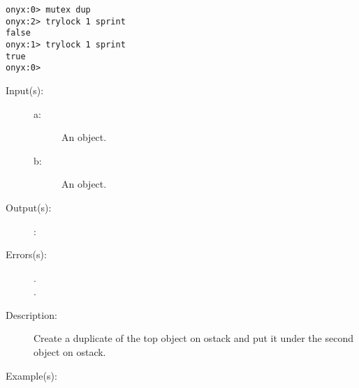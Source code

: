 \begin{description}
\begin{description}
\begin{verbatim}
onyx:0> mutex dup
onyx:2> trylock 1 sprint
false
onyx:1> trylock 1 sprint
true
onyx:0>
		\end{verbatim}
	\end{description}
\label{systemdict:tuck}
\item[{\onyxop{a b}{tuck}{b a b}}: ]
	\begin{description}\item[]
	\item[Input(s): ]
		\begin{description}\item[]
		\item[a: ]
			An object.
		\item[b: ]
			An object.
		\end{description}
	\item[Output(s): ]
		\begin{description}\item[]
		\item[: ]
		\end{description}
	\item[Errors(s): ]
		\begin{description}\item[]
		\item[.]
		\item[.]
		\end{description}
	\item[Description: ]
		Create a duplicate of the top object on ostack and put it under
		the second object on ostack.
	\item[Example(s): ]\begin{verbatim}


\end{verbatim}
\end{description}
\end{description}
